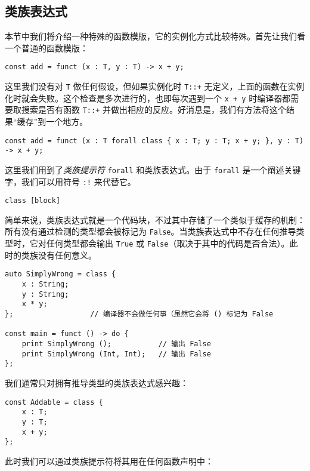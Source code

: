 \subsection{类族表达式}

本节中我们将介绍一种特殊的函数模版，它的实例化方式比较特殊。首先让我们看一个普通的函数模版：

\begin{lstlisting}
const add = funct (x : T, y : T) -> x + y;
\end{lstlisting}

这里我们没有对 \lstinline!T! 做任何假设，但如果实例化时 \lstinline!T::+! 无定义，上面的函数在实例化时就会失败。这个检查是多次进行的，也即每次遇到一个 \lstinline!x + y! 时编译器都需要取搜索是否有函数 \lstinline!T::+! 并做出相应的反应。好消息是，我们有方法将这个结果“缓存”到一个地方。

\begin{lstlisting}
const add = funct (x : T forall class { x : T; y : T; x + y; }, y : T) -> x + y;
\end{lstlisting}

这里我们用到了\emph{类族提示符} \lstinline!forall! 和类族表达式。由于 \lstinline!forall! 是一个阐述关键字，我们可以用符号 \lstinline|:!| 来代替它。

\begin{grammar} \label{grm:class-expression}
	\lstinline!class [block]!
\end{grammar}

简单来说，类族表达式就是一个代码块，不过其中存储了一个类似于缓存的机制：所有没有通过检测的类型都会被标记为 \lstinline!False!。当类族表达式中不存在任何推导类型时，它对任何类型都会输出 \lstinline!True! 或 \lstinline!False!（取决于其中的代码是否合法）。此时的类族没有任何意义。

\begin{lstlisting}
auto SimplyWrong = class {
	x : String;
	y : String;
	x * y;
};					// 编译器不会做任何事（虽然它会将 () 标记为 False

const main = funct () -> do {
	print SimplyWrong ();			// 输出 False
	print SimplyWrong (Int, Int);	// 输出 False
};
\end{lstlisting}

我们通常只对拥有推导类型的类族表达式感兴趣：

\begin{lstlisting}
const Addable = class {
	x : T;
	y : T;
	x + y;
};
\end{lstlisting}

此时我们可以通过类族提示符将其用在任何函数声明中：

